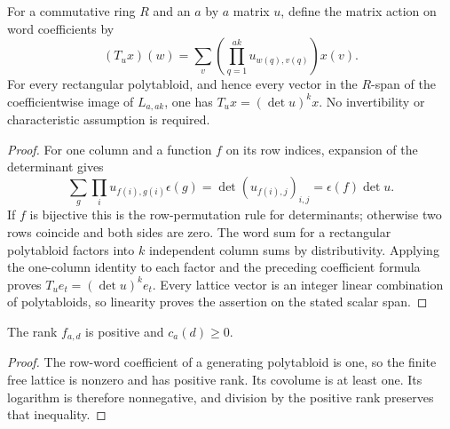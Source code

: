 \begin{lemma}
\label{lem:rectangular-word-covariance}
\leanok
For a commutative ring $R$ and an $a$ by $a$ matrix $u$, define the
matrix action on word coefficients by
\[
 (T_u x)(w)=\sum_v\left(\prod_{q=1}^{ak}u_{w(q),v(q)}\right)x(v).
\]
For every rectangular polytabloid, and hence every vector in the
$R$-span of the coefficientwise image of $L_{a,ak}$, one has
$T_u x=(\det u)^k x$. No invertibility or characteristic assumption
is required.
\end{lemma}
\begin{proof}
For one column and a function $f$ on its row indices, expansion of
the determinant gives
\[
 \sum_g\prod_i u_{f(i),g(i)}\epsilon(g)
 =\det(u_{f(i),j})_{i,j}=\epsilon(f)\det u.
\]
If $f$ is bijective this is the row-permutation rule for determinants;
otherwise two rows coincide and both sides are zero. The word sum
for a rectangular polytabloid factors into $k$ independent column
sums by distributivity. Applying the one-column identity to each
factor and the preceding coefficient formula proves
$T_u e_t=(\det u)^k e_t$. Every lattice vector is an integer linear
combination of polytabloids, so linearity proves the assertion on
the stated scalar span.
\end{proof}

\begin{lemma}
\label{lem:rectangular-covolume-nonneg}
\leanok
The rank $f_{a,d}$ is positive and $c_a(d)\geq0$.
\end{lemma}
\begin{proof}
The row-word coefficient of a generating polytabloid is one,
so the finite free lattice is nonzero and has positive rank.
Its covolume is at least one. Its logarithm is therefore nonnegative,
and division by the positive rank preserves that inequality.
\end{proof}

